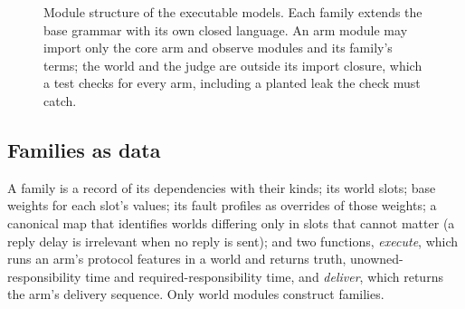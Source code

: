 \begin{figure}[t]
\centering
{}
\caption{Module structure of the executable models. Each family extends the base grammar with its own closed language. An arm module may import only the core arm and observe modules and its family's terms; the world and the judge are outside its import closure, which a test checks for every arm, including a planted leak the check must catch.}
\label{fig:arch}
\end{figure}

\subsection{Families as data}

A family is a record of its dependencies with their kinds; its world slots; base weights for each slot's values; its fault profiles as overrides of those weights; a canonical map that identifies worlds differing only in slots that cannot matter (a reply delay is irrelevant when no reply is sent); and two functions, \emph{execute}, which runs an arm's protocol features in a world and returns truth, unowned-responsibility time and required-responsibility time, and \emph{deliver}, which returns the arm's delivery sequence. Only world modules construct families.

